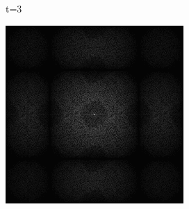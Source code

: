 \begin{figure}[H]
\begin{tcolorbox}[boxrule=4pt,sharp corners=downhill,title=Retargeting]
\begin{subfigure}[b]{0.2\textwidth}
        \caption{t=3}
        \label{pic:sorting_retarget_t3}
    \end{subfigure}
    \begin{subfigure}[b]{0.2\textwidth}
        \centering
        \includegraphics[width=\textwidth]{content/TemporalerAlg/Bilder/Retargeting/Spektren/Ausschnitt3.png}
        \label{pic:sorting_retarget_t3_FFT}
    \end{subfigure}
    \begin{subfigure}[b]{0.1\textwidth}
        \hspace*{1cm}
    \end{subfigure}
    \begin{subfigure}[b]{0.2\textwidth}
        \centering

\end{subfigure}
\end{tcolorbox}
\end{figure}
